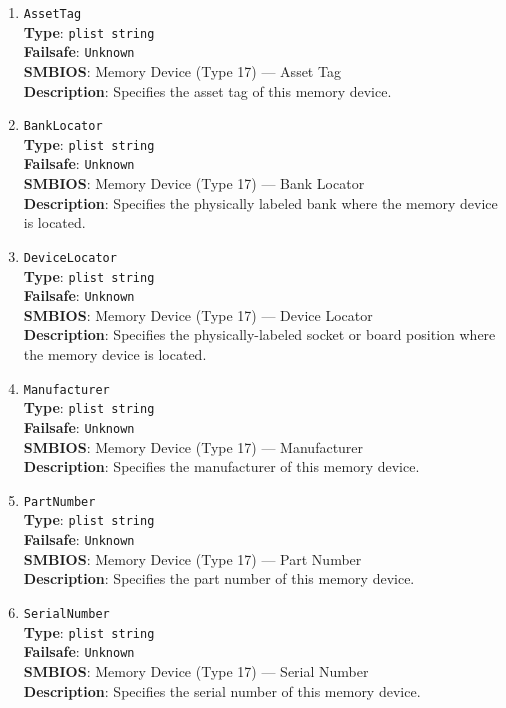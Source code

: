\documentclass[]{article}
\begin{document}
\begin{enumerate}
\item
  \texttt{AssetTag}\\
  \textbf{Type}: \texttt{plist\ string}\\
  \textbf{Failsafe}: \texttt{Unknown}\\
  \textbf{SMBIOS}: Memory Device (Type 17) --- Asset Tag\\
  \textbf{Description}: Specifies the asset tag of this memory device.

\item
  \texttt{BankLocator}\\
  \textbf{Type}: \texttt{plist\ string}\\
  \textbf{Failsafe}: \texttt{Unknown}\\
  \textbf{SMBIOS}: Memory Device (Type 17) --- Bank Locator\\
  \textbf{Description}: Specifies the physically labeled bank where the
  memory device is located.

\item
  \texttt{DeviceLocator}\\
  \textbf{Type}: \texttt{plist\ string}\\
  \textbf{Failsafe}: \texttt{Unknown}\\
  \textbf{SMBIOS}: Memory Device (Type 17) --- Device Locator\\
  \textbf{Description}: Specifies the physically-labeled socket or
  board position where the memory device is located.

\item
  \texttt{Manufacturer}\\
  \textbf{Type}: \texttt{plist\ string}\\
  \textbf{Failsafe}: \texttt{Unknown}\\
  \textbf{SMBIOS}: Memory Device (Type 17) --- Manufacturer\\
  \textbf{Description}: Specifies the manufacturer of this memory device.

\item
  \texttt{PartNumber}\\
  \textbf{Type}: \texttt{plist\ string}\\
  \textbf{Failsafe}: \texttt{Unknown}\\
  \textbf{SMBIOS}: Memory Device (Type 17) --- Part Number\\
  \textbf{Description}: Specifies the part number of this memory device.

\item
  \texttt{SerialNumber}\\
  \textbf{Type}: \texttt{plist\ string}\\
  \textbf{Failsafe}: \texttt{Unknown}\\
  \textbf{SMBIOS}: Memory Device (Type 17) --- Serial Number\\
  \textbf{Description}: Specifies the serial number of this memory device.


\end{enumerate}
\end{document}
